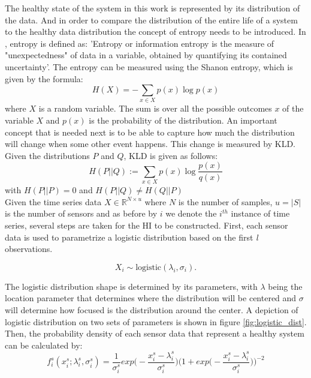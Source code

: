 The healthy state of the system in this work is represented by its distribution of the data. And in order
to compare the distribution of the entire
life of a system to the healthy data distribution the concept of entropy needs to be introduced. In
\cite{DBLP:conf/indin/AremuOHM19}, entropy is defined as:
'Entropy or information entropy is the measure of "unexpectedness" of data in a variable, obtained by quantifying its contained
uncertainty'. The entropy can be measured using the Shanon entropy, which is given by the formula:
\begin{equation}
    H(X) = - \sum_{x \in X} p(x) \log p(x)
\end{equation}
where $X$ is a random variable. The sum is over all the possible outcomes $x$ of the variable $X$ and
$p(x)$ is the probability of the distribution.
An important concept that is needed next is to be able to capture how much the distribution will change when some other event happens.
This change is measured by KLD. \newline Given the distributions $P$ and $Q$, KLD is given as follows:
\begin{equation}
    H(P||Q) := \sum_{x \in X} p(x) \log \frac{p(x)}{q(x)}
\end{equation}
with $H(P||P)=0$ and $H(P||Q) \neq H(Q||P)$ \\



Given the time series data $ X \in \mathbb{R}^{N \times u}$ where $N$ is the number of samples,
$u=|S|$ is the number of sensors and as before by $i$ we denote the $i^{th}$ instance of time series,
several steps are taken for the HI to be constructed. First, each sensor data
is used to parametrize a logistic distribution based on the first \emph{l} observations.

\begin{equation}
    X_i \sim \text{logistic}(\lambda_i, \sigma_i).
\end{equation}

The logistic distribution shape is determined by its parameters, with $\lambda$ being the location parameter that determines where the distribution will
be centered and $\sigma$ will determine how focused is the distribution around the center. A depiction of logistic distribution on two sets of parameters is
shown in figure \ref{fig:logistic_dist}.
Then, the probability density of each sensor data that represent a healthy system can be calculated by:
\begin{equation}
    f_i^s(x_i^s; \lambda_i^s, \sigma_i^s) = \frac{1}{\sigma_i^s}
    exp \bigg(-\frac{x_i^s - \lambda_i^s}{\sigma_i^s}\bigg){\bigg(1+exp \bigg(-\frac{x_i^s - \lambda_i^s}{\sigma_i^s}\bigg)\bigg)^{-2}}
\end{equation}

